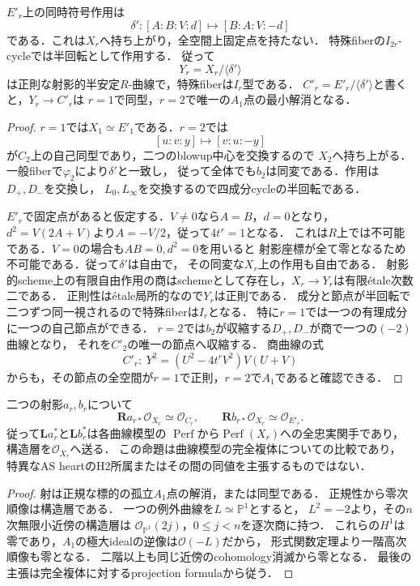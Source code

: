\begin{corollary}[符号作用とその半安定商]
\label{cor:qa-boundary-graph-sign-quotient}
$E'_r$上の同時符号作用は
\[
 \delta':[A:B:V:d]\longmapsto[B:A:V:-d]
\]
である．これは$X_r$へ持ち上がり，全空間上固定点を持たない．
特殊fiberの$I_{2r}$-cycleでは半回転として作用する．
従って
\[
 Y_r=X_r/\langle\delta'\rangle
\]
は正則な射影的半安定$R$-曲線で，特殊fiberは$I_r$型である．
$C'_r=E'_r/\langle\delta'\rangle$と書くと，$Y_r\to C'_r$は
$r=1$で同型，$r=2$で唯一の$A_1$点の最小解消となる．
\end{corollary}
\begin{proof}
$r=1$では$X_1\simeq E'_1$である．$r=2$では
\[
 [u:v:y]\longmapsto[v:u:-y]
\]
が$C_2$上の自己同型であり，二つのblowup中心を交換するので
$X_2$へ持ち上がる．一般fiberで$\varphi_2$により$\delta'$と一致し，
従って全体でも$b_2$は同変である．作用は$D_+,D_-$を交換し，
$L_0,L_\infty$を交換するので四成分cycleの半回転である．

$E'_r$で固定点があると仮定する．$V\ne0$なら$A=B$，$d=0$となり，
$d^2=V(2A+V)$より$A=-V/2$，従って$4t^r=1$となる．
これは$R$上では不可能である．$V=0$の場合も$AB=0,d^2=0$を用いると
射影座標が全て零となるため不可能である．従って$\delta'$は自由で，
その同変な$X_r$上の作用も自由である．
射影的scheme上の有限自由作用の商はschemeとして存在し\cite[Lemma 66.14.2]{StacksFreeQuotients}，$X_r\to Y_r$は有限\'{e}tale次数二である．
正則性は\'{e}tale局所的なので$Y_r$は正則である．
成分と節点が半回転で二つずつ同一視されるので特殊fiberは$I_r$となる．
特に$r=1$では一つの有理成分に一つの自己節点ができる．
$r=2$では$b_2$が収縮する$D_+,D_-$が商で一つの$(-2)$曲線となり，
それを$C'_2$の唯一の節点へ収縮する．
商曲線の式
\[
 C'_r:\ Y^2=(U^2-4t^rV^2)V(U+V)
\]
からも，その節点の全空間が$r=1$で正則，$r=2$で$A_1$であると確認できる．
\end{proof}

\begin{proposition}[構造層と完全複体の比較]
\label{prop:qa-boundary-graph-structure-sheaf}
二つの射影$a_r,b_r$について
\[
 \mathbf R a_{r*}\mathcal O_{X_r}\simeq\mathcal O_{C_r},
 \qquad
 \mathbf R b_{r*}\mathcal O_{X_r}\simeq\mathcal O_{E'_r}.
\]
従って$\mathbf L a_r^*$と$\mathbf L b_r^*$は各曲線模型の
$\operatorname{Perf}$から$\operatorname{Perf}(X_r)$への全忠実関手であり，
構造層を$\mathcal O_{X_r}$へ送る．
この命題は曲線模型の完全複体についての比較であり，
特異なAS heartのH2所属またはその間の同値を主張するものではない．
\end{proposition}
\begin{proof}
射は正規な標的の孤立$A_1$点の解消，または同型である．
正規性から零次順像は構造層である．
一つの例外曲線を$L\simeq\mathbb P^1$とすると，
$L^2=-2$より，その$n$次無限小近傍の構造層は
$\mathcal O_{\mathbb P^1}(2j)$，$0\le j<n$を逐次商に持つ．
これらの$H^1$は零であり，$A_1$の極大idealの逆像は$\mathcal O(-L)$だから，
形式関数定理\cite[Theorem 30.20.5]{StacksFormalFunctions}より一階高次順像も零となる．
二階以上も同じ近傍のcohomology消滅から零となる．
最後の主張は完全複体に対するprojection formulaから従う．
\end{proof}

